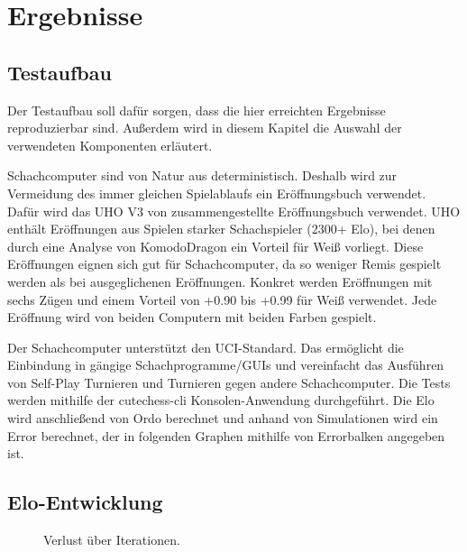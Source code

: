\chapter{Ergebnisse}
\label{chap:Ergebnisse}

\section{Testaufbau}

Der Testaufbau soll dafür sorgen, dass die hier erreichten Ergebnisse reproduzierbar sind. Außerdem wird in diesem Kapitel die Auswahl der verwendeten Komponenten erläutert.

Schachcomputer sind von Natur aus deterministisch. Deshalb wird zur Vermeidung des immer gleichen Spielablaufs ein Eröffnungsbuch verwendet. Dafür wird das \ac{UHO} V3 von \citeauthor{Pohl2021} \cite{Pohl2021} zusammengestellte Eröffnungsbuch verwendet. \ac{UHO} enthält Eröffnungen aus Spielen starker Schachspieler (2300+ Elo), bei denen durch eine Analyse von KomodoDragon \cite{KomodoDragon} ein Vorteil für Weiß vorliegt. Diese Eröffnungen eignen sich gut für Schachcomputer, da so weniger Remis gespielt werden als bei ausgeglichenen Eröffnungen. Konkret werden Eröffnungen mit sechs Zügen und einem Vorteil von +0.90 bis +0.99 für Weiß verwendet. Jede Eröffnung wird von beiden Computern mit beiden Farben gespielt.

Der Schachcomputer unterstützt den \ac{UCI}-Standard. Das ermöglicht die Einbindung in gängige Schachprogramme/GUIs und vereinfacht das Ausführen von Self-Play Turnieren und Turnieren gegen andere Schachcomputer. Die Tests werden mithilfe der cutechess-cli \cite{CutechessRepo} Konsolen-Anwendung durchgeführt. Die Elo wird anschließend von Ordo \cite{OrdoRepo} berechnet und anhand von Simulationen wird ein Error berechnet, der in folgenden Graphen mithilfe von Errorbalken angegeben ist.

\section{Elo-Entwicklung}

\begin{figure}
  \centering
  \caption{Verlust über Iterationen.}
  \label{fig:loss}
\end{figure}

